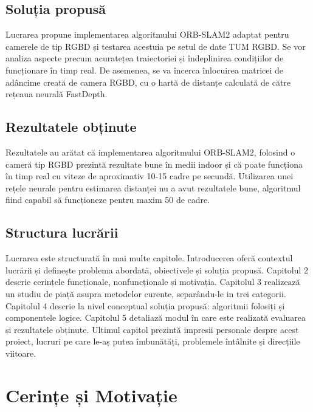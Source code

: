 \documentclass[12pt,a4paper]{report}
\begin{document}
\section{Soluția propusă}
Lucrarea propune implementarea algoritmului ORB-SLAM2 adaptat pentru camerele de tip RGBD
și testarea acestuia pe setul de date TUM RGBD\cite{tum}. Se vor analiza aspecte precum acuratețea 
traiectoriei și îndeplinirea condițiilor de funcționare în timp real. De asemenea, se va 
încerca înlocuirea matricei de adâncime creată de camera RGBD, cu o hartă de distanțe 
calculată de către rețeaua neurală FastDepth\cite{fastdepth}.  

\section{Rezultatele obținute}
Rezultatele au arătat că implementarea algoritmului ORB-SLAM2, folosind o cameră tip RGBD 
prezintă rezultate bune în medii indoor și că poate funcționa în timp real cu viteze de aproximativ
10{-}15 cadre pe secundă. Utilizarea unei rețele neurale pentru estimarea distanței nu a 
avut rezultatele bune, algoritmul fiind capabil să funcționeze pentru maxim 50 de cadre.  

\section{Structura lucrării}
Lucrarea este structurată în mai multe capitole. Introducerea oferă contextul lucrării și definește
problema abordată, obiectivele și soluția propusă. Capitolul 2 descrie cerințele funcționale, 
nonfuncționale și motivația. Capitolul 3 realizează un studiu de piață asupra metodelor curente, 
separându-le in trei categorii. Capitolul 4 descrie la nivel conceptual soluția propusă: algoritmii
folosiți și componentele logice. Capitolul 5 detaliază modul în care este realizată evaluarea și 
rezultatele obținute. Ultimul capitol prezintă impresii personale despre acest proiect, lucruri pe 
care le-aș putea îmbunătăți, problemele întâlnite și direcțiile viitoare. 

\chapter{Cerințe și Motivație}
\end{document}
